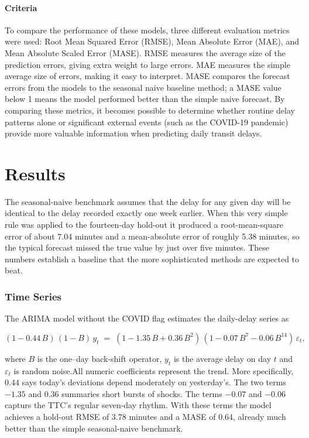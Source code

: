 \documentclass[
]{article}
\begin{document}
\paragraph{Criteria}\label{criteria}

To compare the performance of these models, three different evaluation
metrics were used: Root Mean Squared Error (RMSE), Mean Absolute Error
(MAE), and Mean Absolute Scaled Error (MASE). RMSE measures the average
size of the prediction errors, giving extra weight to large errors. MAE
measures the simple average size of errors, making it easy to interpret.
MASE compares the forecast errors from the models to the seasonal naive
baseline method; a MASE value below 1 means the model performed better
than the simple naive forecast. By comparing these metrics, it becomes
possible to determine whether routine delay patterns alone or
significant external events (such as the COVID-19 pandemic) provide more
valuable information when predicting daily transit delays.

\section{Results}\label{results}

The seasonal-naive benchmark assumes that the delay for any given day
will be identical to the delay recorded exactly one week earlier. When
this very simple rule was applied to the fourteen-day hold-out it
produced a root-mean-square error of about 7.04 minutes and a
mean-absolute error of roughly 5.38 minutes, so the typical forecast
missed the true value by just over five minutes. These numbers establish
a baseline that the more sophisticated methods are expected to beat.

\subsubsection{Time Series}\label{time-series}

The ARIMA model without the COVID flag estimates the daily-delay series
as

\[
(1 - 0.44\,B)\,(1-B)\,y_t
    \;=\;
    (1 - 1.35\,B + 0.36\,B^{2})\,
    (1 - 0.07\,B^{7} - 0.06\,B^{14})\,\varepsilon_t,
\]

where \(B\) is the one--day back-shift operator, \(y_t\) is the average
delay on day \(t\) and \(\varepsilon_t\) is random noise.All numeric
coefficients represent the trend. More specifically, \(0.44\) says
today's deviations depend moderately on yesterday's. The two terms
\(-1.35\) and \(0.36\) summaries short bursts of shocks. The terms
\(-0.07\) and \(-0.06\) capturs the TTC's regular seven-day rhythm. With
these terms the model achieves a hold-out RMSE of 3.78 minutes and a
MASE of 0.64, already much better than the simple seasonal-naive
benchmark.
\end{document}

